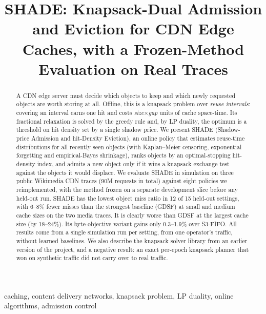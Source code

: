 \documentclass[conference]{IEEEtran}
\begin{document}
\title{SHADE: Knapsack-Dual Admission and Eviction for CDN Edge Caches, with a Frozen-Method Evaluation on Real Traces}

\author{
}

\maketitle

\begin{abstract}
A CDN edge server must decide which objects to keep and which newly requested objects are worth storing at all.
Offline, this is a knapsack problem over \emph{reuse intervals}: covering an interval earns one hit and costs
\emph{size}$\times$\emph{gap} units of cache space-time. Its fractional relaxation is solved by the greedy rule and,
by LP duality, the optimum is a threshold on hit density set by a single shadow price. We present SHADE
(Shadow-price Admission and hit-Density Eviction), an online policy that estimates reuse-time distributions for all
recently seen objects (with Kaplan--Meier censoring, exponential forgetting and empirical-Bayes shrinkage), ranks
objects by an optimal-stopping hit-density index, and admits a new object only if it wins a knapsack exchange test
against the objects it would displace. We evaluate SHADE in simulation on three public Wikimedia CDN traces (90M
requests in total) against eight policies we reimplemented, with the method frozen on a separate development slice
before any held-out run. SHADE has the lowest object miss ratio in 12 of 15 held-out settings, with 6--8\% fewer
misses than the strongest baseline (GDSF) at small and medium cache sizes on the two media traces. It is clearly
worse than GDSF at the largest cache size (by 18--24\%). Its byte-objective variant gains only 0.3--1.9\% over
S3-FIFO. All results come from a single simulation run per setting, from one operator's traffic, without learned
baselines. We also describe the knapsack solver library from an earlier version of the project, and a negative result:
an exact per-epoch knapsack planner that won on synthetic traffic did not carry over to real traffic.
\end{abstract}

\begin{IEEEkeywords}
caching, content delivery networks, knapsack problem, LP duality, online algorithms, admission control
\end{IEEEkeywords}
\end{document}
